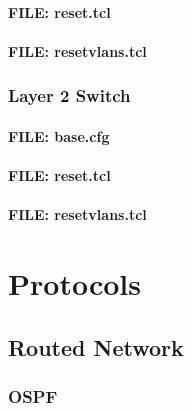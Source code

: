 \documentclass[a4paper,12pt,twoside,twocolumn]{book}
\begin{document}
\subsubsection{FILE: reset.tcl}

\subsubsection{FILE: resetvlans.tcl}


\newpage


\subsection{Layer 2 Switch}
\subsubsection{FILE: base.cfg}

\subsubsection{FILE: reset.tcl}

\subsubsection{FILE: resetvlans.tcl}



\chapter{Protocols}

\section{Routed Network}

\subsection{OSPF}
\end{document}
